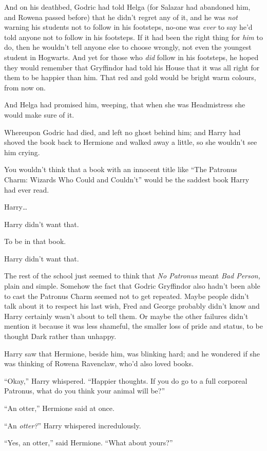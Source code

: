 And on his deathbed, Godric had told Helga (for Salazar had abandoned him, and Rowena passed before) that he didn’t regret any of it, and he was \emph{not} warning his students not to follow in his footsteps, no-one was \emph{ever} to say he’d told anyone not to follow in his footsteps. If it had been the right thing for \emph{him} to do, then he wouldn’t tell anyone else to choose wrongly, not even the youngest student in Hogwarts. And yet for those who \emph{did} follow in his footsteps, he hoped they would remember that Gryffindor had told his House that it was all right for them to be happier than him. That red and gold would be bright warm colours, from now on.

And Helga had promised him, weeping, that when she was Headmistress she would make sure of it.

Whereupon Godric had died, and left no ghost behind him; and Harry had shoved the book back to Hermione and walked away a little, so she wouldn’t see him crying.

You wouldn’t think that a book with an innocent title like “The Patronus Charm: Wizards Who Could and Couldn’t” would be the saddest book Harry had ever read.

Harry…

Harry didn’t want that.

To be in that book.

Harry didn’t want that.

The rest of the school just seemed to think that \emph{No Patronus} meant \emph{Bad Person,} plain and simple. Somehow the fact that Godric Gryffindor also hadn’t been able to cast the Patronus Charm seemed not to get repeated. Maybe people didn’t talk about it to respect his last wish, Fred and George probably didn’t know and Harry certainly wasn’t about to tell them. Or maybe the other failures didn’t mention it because it was less shameful, the smaller loss of pride and status, to be thought Dark rather than unhappy.

Harry saw that Hermione, beside him, was blinking hard; and he wondered if she was thinking of Rowena Ravenclaw, who’d also loved books.

“Okay,” Harry whispered. “Happier thoughts. If you do go to a full corporeal Patronus, what do you think your animal will be?”

“An otter,” Hermione said at once.

“An \emph{otter?}” Harry whispered incredulously.

“Yes, an otter,” said Hermione. “What about yours?”

